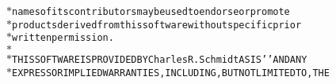 {{\begin{tabbing}
{\texttt{$\ast$\hspace{42pt}names\hspace{6pt}of\hspace{6pt}its\hspace{6pt}contributors\hspace{6pt}may\hspace{6pt}be\hspace{6pt}used\hspace{6pt}to\hspace{6pt}endorse\hspace{6pt}or\hspace{6pt}promote}}\\
{\texttt{$\ast$\hspace{42pt}products\hspace{6pt}derived\hspace{6pt}from\hspace{6pt}this\hspace{6pt}software\hspace{6pt}without\hspace{6pt}specific\hspace{6pt}prior}}\\
{\texttt{$\ast$\hspace{42pt}written\hspace{6pt}permission.}}\\
{\texttt{$\ast$}}\\
{\texttt{$\ast$\hspace{6pt}THIS\hspace{6pt}SOFTWARE\hspace{6pt}IS\hspace{6pt}PROVIDED\hspace{6pt}BY\hspace{6pt}Charles\hspace{6pt}R.\hspace{6pt}SchmidtAS\hspace{6pt}IS{'}{'}\hspace{6pt}AND\hspace{6pt}ANY}}\\
{\texttt{$\ast$\hspace{6pt}EXPRESS\hspace{6pt}OR\hspace{6pt}IMPLIED\hspace{6pt}WARRANTIES,\hspace{6pt}INCLUDING,\hspace{6pt}BUT\hspace{6pt}NOT\hspace{6pt}LIMITED\hspace{6pt}TO,\hspace{6pt}THE}}\\

\end{tabbing}}}
